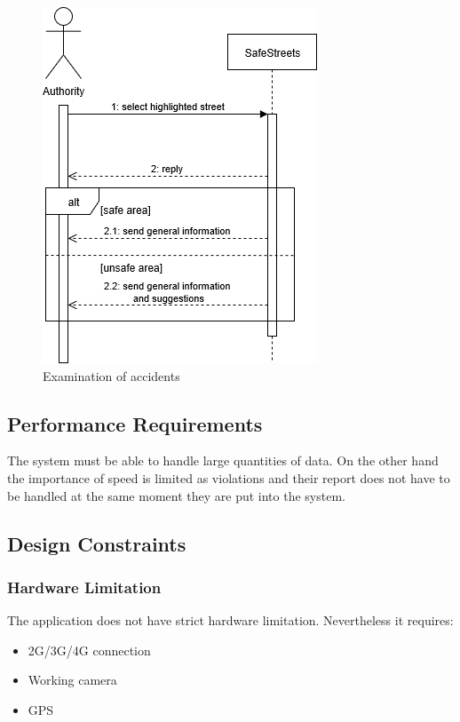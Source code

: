 \begin{figure}
[H]
\includegraphics[scale=0.5]{Images/Diagrams/Sequence2.png}
\caption{\label{fig:Sequence2}Examination of accidents}
\end{figure}

\subsection{Performance Requirements}
The system must be able to handle large quantities of data. On the other hand the importance of speed is limited as violations and their report does not have to be handled at the same moment they are put into the system.

\subsection{Design Constraints}

\subsubsection{Hardware Limitation}

The application does not have strict hardware limitation. Nevertheless it requires:

\begin{itemize}

\item 2G/3G/4G connection

\item Working camera

\item GPS

\end{itemize}

